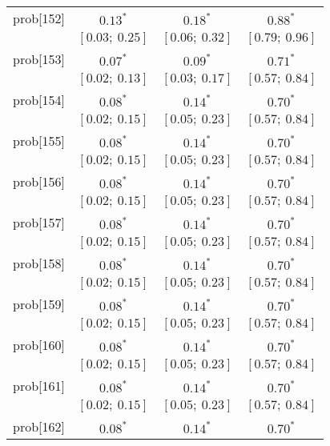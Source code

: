 \begin{table}
\begin{center}
\begin{tabular}{l c c c }
prob[152] & $0.13^{*}$              & $0.18^{*}$              & $0.88^{*}$            \\
          & $[0.03;\ 0.25]$         & $[0.06;\ 0.32]$         & $[0.79;\ 0.96]$       \\
prob[153] & $0.07^{*}$              & $0.09^{*}$              & $0.71^{*}$            \\
          & $[0.02;\ 0.13]$         & $[0.03;\ 0.17]$         & $[0.57;\ 0.84]$       \\
prob[154] & $0.08^{*}$              & $0.14^{*}$              & $0.70^{*}$            \\
          & $[0.02;\ 0.15]$         & $[0.05;\ 0.23]$         & $[0.57;\ 0.84]$       \\
prob[155] & $0.08^{*}$              & $0.14^{*}$              & $0.70^{*}$            \\
          & $[0.02;\ 0.15]$         & $[0.05;\ 0.23]$         & $[0.57;\ 0.84]$       \\
prob[156] & $0.08^{*}$              & $0.14^{*}$              & $0.70^{*}$            \\
          & $[0.02;\ 0.15]$         & $[0.05;\ 0.23]$         & $[0.57;\ 0.84]$       \\
prob[157] & $0.08^{*}$              & $0.14^{*}$              & $0.70^{*}$            \\
          & $[0.02;\ 0.15]$         & $[0.05;\ 0.23]$         & $[0.57;\ 0.84]$       \\
prob[158] & $0.08^{*}$              & $0.14^{*}$              & $0.70^{*}$            \\
          & $[0.02;\ 0.15]$         & $[0.05;\ 0.23]$         & $[0.57;\ 0.84]$       \\
prob[159] & $0.08^{*}$              & $0.14^{*}$              & $0.70^{*}$            \\
          & $[0.02;\ 0.15]$         & $[0.05;\ 0.23]$         & $[0.57;\ 0.84]$       \\
prob[160] & $0.08^{*}$              & $0.14^{*}$              & $0.70^{*}$            \\
          & $[0.02;\ 0.15]$         & $[0.05;\ 0.23]$         & $[0.57;\ 0.84]$       \\
prob[161] & $0.08^{*}$              & $0.14^{*}$              & $0.70^{*}$            \\
          & $[0.02;\ 0.15]$         & $[0.05;\ 0.23]$         & $[0.57;\ 0.84]$       \\
prob[162] & $0.08^{*}$              & $0.14^{*}$              & $0.70^{*}$            \\

\end{tabular}
\end{center}
\end{table}
